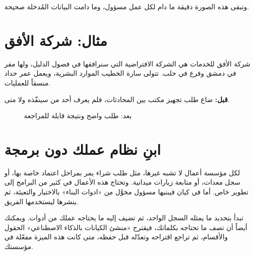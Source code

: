 وتبقى هذه الصورة دقيقة ما دام لكل عمل مسؤول، وما دامت البيانات المُدخلة صحيحة.

\section{مثال: شركة الأفق}
\label{sec:intro-entity}

شركة الأفق للخدمات هي الشركة الافتراضية التي سنرافقها في فصول الدليل، ولها مقر في دمشق وفرع في حلب. تتولى سارة الخطيب الموارد البشرية، ويعمل عمر حداد منسقاً للعمليات.

\textbf{قبل:} ضاع طلب تجهيز مكتب بين المحادثات، فلم يعرف أحد من سينفّذه ولا متى.

\begin{figure}[H]
\centering
{}
\rclegend
\caption{بعد: طلب واضح ونتيجة قابلة للمراجعة}
\label{fig:intro-workday}
\end{figure}

\section{ابنِ نظام عملك دون برمجة}
\label{sec:intro-no-code}

لكل مؤسسة أعمال لا تشبه غيرها، مثل طلب شراء يمر بمراحل اعتماد خاصة بها، أو سجل معدات، أو متابعة زيارات ميدانية. وتحتاج هذه الأعمال في كثير من البرامج إلى تطوير خاص. أما في كيان فيبنيها مسؤول مخوَّل من «ادوات البناء» بالاختيار والتعبئة، ثم ينشرها ليستخدمها الفريق.

تبدأ بتحديد ما يمثله السجل الواحد، ثم تضيف إليه ما يحتاجه عملك من أدوات. ويمكنك أيضاً أن تصف ما تحتاجه بكلماتك، فيقترح «منشئ الكيانات بالذكاء الاصطناعي» الحقول والأقسام، ثم تراجع اقتراحه وتعدّله قبل حفظه، متى كانت هذه الميزة مفعّلة في مؤسستك.

